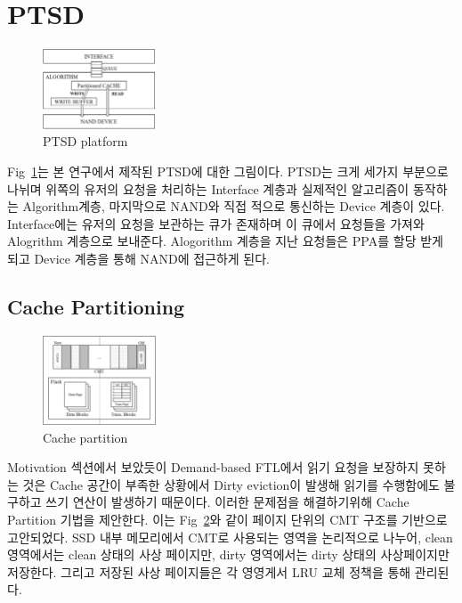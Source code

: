 \documentclass[conference]{IEEEtran}
\begin{document}
\section{PTSD}
\begin{figure}[h]
	\centering
	\includegraphics[width=0.3\textwidth]{image/PTSD/PTSD.png}
	\caption{PTSD platform}
	\label{fig:PTSD}
\end{figure}

Fig~\ref{fig:PTSD}는 본 연구에서 제작된 PTSD에 대한 그림이다. PTSD는 크게 세가지 부분으로 나뉘며
위쪽의 유저의 요청을 처리하는 Interface 계층과 실제적인 알고리즘이 동작하는 Algorithm계층,
마지막으로 NAND와 직접 적으로 통신하는 Device 계층이 있다. Interface에는 유저의 요청을 보관하는
큐가 존재하며 이 큐에서 요청들을 가져와 Alogrithm 계층으로 보내준다. Alogorithm 계층을 지난 요청들은
PPA를 할당 받게 되고 Device 계층을 통해 NAND에 접근하게 된다.

\subsection{Cache Partitioning}

\begin{figure}[h]
	\centering
	\includegraphics[width=0.3\textwidth]{image/PTSD/cache.png}
	\caption{Cache partition}
	\label{fig:cache}
\end{figure}

Motivation 섹션에서 보았듯이 Demand-based FTL에서 읽기 요청을 보장하지 못하는 것은 Cache 공간이
부족한 상황에서 Dirty eviction이 발생해 읽기를 수행함에도 불구하고 쓰기 연산이 발생하기 때문이다.
이러한 문제점을 해결하기위해 Cache Partition 기법을 제안한다. 이는 Fig~\ref{fig:cache}와 같이
페이지 단위의 CMT 구조를 기반으로 고안되었다. SSD 내부 메모리에서 CMT로 사용되는 영역을 논리적으로
나누어, clean 영역에서는 clean 상태의 사상 페이지만, dirty 영역에서는 dirty 상태의 사상페이지만
저장한다. 그리고 저장된 사상 페이지들은 각 영영게서 LRU 교체 정책을 통해 관리된다.\par
\end{document}
